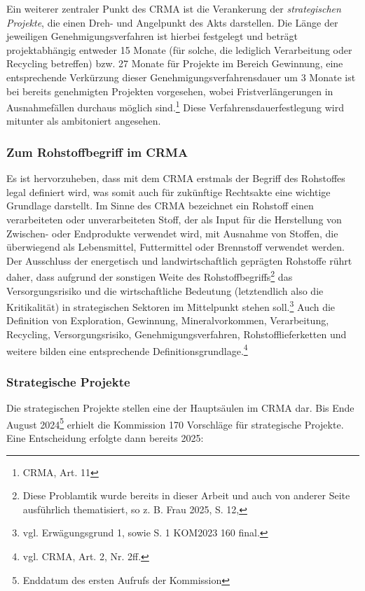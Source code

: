 \documentclass[12pt,a4paper,oneside]{book} %
\begin{document}
	
	Ein weiterer zentraler Punkt des CRMA ist die Verankerung der \textit{strategischen Projekte}, die einen Dreh- und Angelpunkt des Akts darstellen.
	Die Länge der jeweiligen Genehmigungsverfahren ist hierbei festgelegt und beträgt projektabhängig entweder 15 Monate (für solche, die lediglich Verarbeitung oder Recycling betreffen) bzw. 27 Monate für Projekte im Bereich Gewinnung, eine entsprechende Verkürzung dieser Genehmigungsverfahrensdauer um 3 Monate ist bei bereits genehmigten Projekten vorgesehen, wobei Fristverlängerungen in Ausnahmefällen durchaus möglich sind.\footnote{CRMA, Art. 11} Diese Verfahrensdauerfestlegung wird mitunter als ambitoniert angesehen.\autocite{Quantz, ZfPC 2024, 1}
	
	
	
	\subsubsection{Zum Rohstoffbegriff im CRMA}
	Es ist hervorzuheben, dass mit dem CRMA erstmals der Begriff des Rohstoffes legal definiert wird, was somit auch für zukünftige Rechtsakte eine wichtige Grundlage darstellt. Im Sinne des CRMA bezeichnet ein Rohstoff \glqq einen verarbeiteten oder unverarbeiteten Stoff, der als Input für die Herstellung von Zwischen- oder Endprodukte verwendet wird, mit Ausnahme von Stoffen, die überwiegend als Lebensmittel, Futtermittel oder Brennstoff verwendet werden\grqq. Der Ausschluss der energetisch und landwirtschaftlich geprägten Rohstoffe rührt daher, dass aufgrund der sonstigen Weite des Rohstoffbegriffs\footnote{Diese Problamtik wurde bereits in dieser Arbeit und auch von anderer Seite ausführlich thematisiert, so z. B. Frau 2025, S. 12, } das Versorgungsrisiko und die wirtschaftliche Bedeutung (letztendlich also die \glqq Kritikalität\grqq) in strategischen Sektoren im Mittelpunkt stehen soll.\footnote{vgl. Erwägungsgrund 1, sowie S. 1 KOM2023 160 final.}
	Auch die Definition von Exploration, Gewinnung, Mineralvorkommen, Verarbeitung, Recycling, Versorgungsrisiko, Genehmigungsverfahren, Rohstofflieferketten und weitere bilden eine entsprechende Definitionsgrundlage.\footnote{vgl. CRMA, Art. 2, Nr. 2ff.}
	
	\subsubsection{Strategische Projekte}
	Die strategischen Projekte stellen eine der Hauptsäulen im CRMA dar. Bis Ende August 2024\footnote{Enddatum des ersten Aufrufs der Kommission} erhielt die Kommission 170 Vorschläge für strategische Projekte. Eine Entscheidung erfolgte dann bereits 2025:
	
\end{document}
